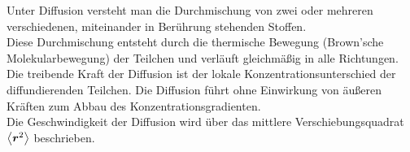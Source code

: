 \begin{notebox}
  Unter Diffusion versteht man die Durchmischung von zwei oder mehreren verschiedenen, miteinander in Berührung stehenden Stoffen.\\
  Diese Durchmischung entsteht durch die thermische Bewegung (Brown'sche Molekularbewegung) der Teilchen und verläuft gleichmäßig in alle
  Richtungen.\\
  Die treibende Kraft der Diffusion ist der lokale Konzentrationsunterschied der diffundierenden Teilchen. Die Diffusion führt ohne
  Einwirkung von äußeren Kräften zum Abbau des Konzentrationsgradienten.\\
  Die Geschwindigkeit der Diffusion wird über das mittlere Verschiebungsquadrat $\left\langle\boldsymbol r ^2\right\rangle$ beschrieben.
  \end{notebox}
